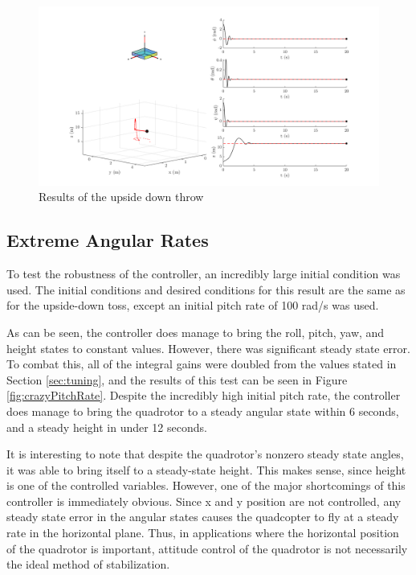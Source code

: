 \documentclass[12pt]{article}
\begin{document}
\begin{center}
\begin{figure}[H]
\captionsetup{width=1\textwidth}
\centering
\includegraphics[width=1\textwidth]{upside_down_throw.png}
\caption{\label{fig:upside_down_throw}Results of the upside down throw}
\end{figure}
\end{center}

\subsection{Extreme Angular Rates}
To test the robustness of the controller, an incredibly large initial condition was used. The initial conditions and desired conditions for this result are the same as for the upside-down toss, except an initial pitch rate of 100 rad/s was used.

As can be seen, the controller does manage to bring the roll, pitch, yaw, and height states to constant values. However, there was significant steady state error. To combat this, all of the integral gains were doubled from the values stated in Section \ref{sec:tuning}, and the results of this test can be seen in Figure \ref{fig:crazyPitchRate}. Despite the incredibly high initial pitch rate, the controller does manage to bring the quadrotor to a steady angular state within 6 seconds, and a steady height in under 12 seconds. 

It is interesting to note that despite the quadrotor's nonzero steady state angles, it was able to bring itself to a steady-state height. This makes sense, since height is one of the controlled variables. However, one of the major shortcomings of this controller is immediately obvious. Since x and y position are not controlled, any steady state error in the angular states causes the quadcopter to fly at a steady rate in the horizontal plane. Thus, in applications where the horizontal position of the quadrotor is important, attitude control of the quadrotor is not necessarily the ideal method of stabilization. 
\end{document}
